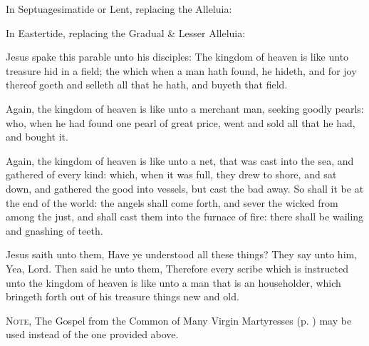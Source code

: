\begin{rubric}
{In Septuagesimatide or Lent, replacing the Alleluia:}
\end{rubric}

\vspace{-1ex}


\begin{rubric}
{In Eastertide, replacing the Gradual \& Lesser Alleluia:}
\end{rubric}

\vspace{-1ex}


 Jesus spake this parable unto his disciples: The kingdom of heaven is like unto treasure hid in a field; the which when a man hath found, he hideth, and for joy thereof goeth and selleth all that he hath, and buyeth that field.

Again, the kingdom of heaven is like unto a merchant man, seeking goodly pearls: who, when he had found one pearl of great price, went and sold all that he had, and bought it.

Again, the kingdom of heaven is like unto a net, that was cast into the sea, and gathered of every kind: which, when it was full, they drew to shore, and sat down, and gathered the good into vessels, but cast the bad away. So shall it be at the end of the world: the angels shall come forth, and sever the wicked from among the just, and shall cast them into the furnace of fire: there shall be wailing and gnashing of teeth.

Jesus saith unto them, Have ye understood all these things? They say unto him, Yea, Lord. Then said he unto them, Therefore every scribe which is instructed unto the kingdom of heaven is like unto a man that is an householder, which bringeth forth out of his treasure things new and old.

\begin{rubric}
	\textsc{Note,} The Gospel from the Common of Many Virgin Martyresses (p. \pageref{CommonVirginMartyrs}) may be used instead of the one provided above.
\end{rubric}

